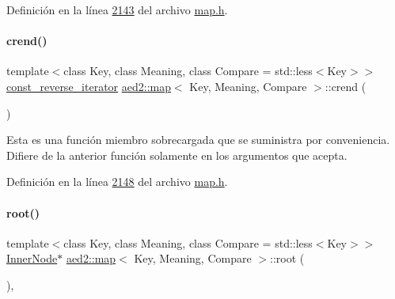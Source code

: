 Definición en la línea \hyperlink{map_8h_source_l02143}{2143} del archivo \hyperlink{map_8h_source}{map.\+h}.

\mbox{\label{classaed2_1_1map_a40933b2efe1cb479de9195ea947244d1_a40933b2efe1cb479de9195ea947244d1}} 
\paragraph{\texorpdfstring{crend()}{crend()}}
{\footnotesize\ttfamily template$<$class Key, class Meaning, class Compare = std\+::less$<$\+Key$>$$>$ \\
\hyperlink{classaed2_1_1map_aed66a216549d13078a3ea6978ea0b768_aed66a216549d13078a3ea6978ea0b768}{const\+\_\+reverse\+\_\+iterator} \hyperlink{classaed2_1_1map}{aed2\+::map}$<$ Key, Meaning, Compare $>$\+::crend (\begin{DoxyParamCaption}{ }\end{DoxyParamCaption})\hspace{0.3cm}{\ttfamily [inline]}}

Esta es una función miembro sobrecargada que se suministra por conveniencia. Difiere de la anterior función solamente en los argumentos que acepta. 

Definición en la línea \hyperlink{map_8h_source_l02148}{2148} del archivo \hyperlink{map_8h_source}{map.\+h}.

\mbox{\label{classaed2_1_1map_a07ab50eda249a57858a34037d4c4c7b2_a07ab50eda249a57858a34037d4c4c7b2}} 
\paragraph{\texorpdfstring{root()}{root()}\hspace{0.1cm}{\footnotesize\ttfamily [1/2]}}
{\footnotesize\ttfamily template$<$class Key, class Meaning, class Compare = std\+::less$<$\+Key$>$$>$ \\
\hyperlink{structaed2_1_1map_1_1InnerNode}{Inner\+Node}$\ast$ \hyperlink{classaed2_1_1map}{aed2\+::map}$<$ Key, Meaning, Compare $>$\+::root (\begin{DoxyParamCaption}{ }\end{DoxyParamCaption})\hspace{0.3cm}{\ttfamily [inline]}, {\ttfamily [private]}}



